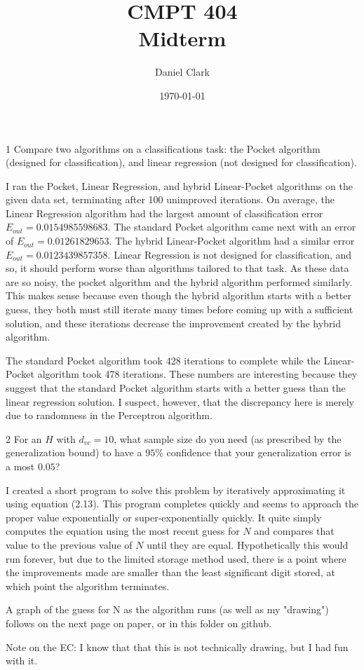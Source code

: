 \documentclass[12pt]{article}
\title{CMPT 404\\Midterm}
\author{Daniel Clark}
\date{\today}
\begin{document}
\maketitle

\begin{description} 
\begin{doublespace}


\item[1] Compare two algorithms on a classifications task: the Pocket algorithm (designed for classification), and linear regression (not designed for classification).

I ran the Pocket, Linear Regression, and hybrid Linear-Pocket algorithms on the given data set, terminating after 100 unimproved iterations. On average, the Linear Regression algorithm had the largest amount of classification error $E_{out} = 0.0154985598683$. The standard Pocket algorithm came next with an error of $E_{out} = 0.01261829653$. The hybrid Linear-Pocket algorithm had a similar error $E_{out} = 0.0123439857358$. Linear Regression is not designed for classification, and so, it should perform worse than algorithms tailored to that task. As these data are so noisy, the pocket algorithm and the hybrid algorithm performed similarly. This makes sense because even though the hybrid algorithm starts with a better guess, they both must still iterate many times before coming up with a sufficient solution, and these iterations decrease the improvement created by the hybrid algorithm.

The standard Pocket algorithm took 428 iterations to complete while the Linear-Pocket algorithm took 478 iterations. These numbers are interesting because they suggest that the standard Pocket algorithm starts with a better guess than the linear regression solution. I suspect, however, that the discrepancy here is merely due to randomness in the Perceptron algorithm.


\item[2] For an $H$ with $d_{vc} = 10$, what sample size do you need (as prescribed by the generalization bound) to have a $95\%$ confidence that your generalization error is a most $0.05$?

I created a short program to solve this problem by iteratively approximating it using equation (2.13). This program completes quickly and seems to approach the proper value exponentially or super-exponentially quickly. It quite simply computes the equation using the most recent guess for $N$ and compares that value to the previous value of $N$ until they are equal. Hypothetically this would run forever, but due to the limited storage method used, there is a point where the improvements made are smaller than the least significant digit stored, at which point the algorithm terminates.

A graph of the guess for N as the algorithm runs (as well as my "drawing") follows on the next page on paper, or in this folder on github.

Note on the EC: I know that that this is not technically drawing, but I had fun with it.

\end{doublespace}
\end{description}
\end{document}
